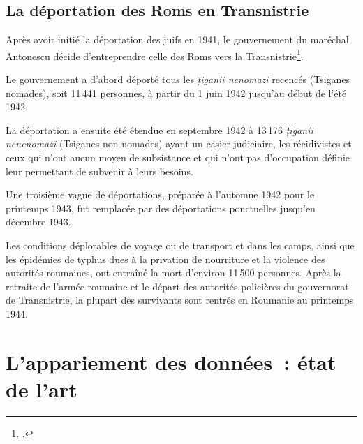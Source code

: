 \documentclass[a4paper,12pt,twoside]{book}
\begin{document}
        \pagebreak
        
        \section*{La déportation des Roms en Transnistrie}
	    
	        Après avoir initié la déportation des juifs en 1941, le gouvernement du maréchal Antonescu décide d'entreprendre celle des Roms vers la Transnistrie\footcites[Quelques titres de référence détaillant la déportation des Roms :][]{achimRomaRomanianHistory2004,achimDeportationRromsTransnistrie2016,internationalcommisionontheholocaustinromaniaFinalReport2005a,aboutGenocidePersecutionRoma2016}.
	        
	        Le gouvernement a d'abord déporté tous les \og{}\textit{țiganii nenomazi}\fg{} recencés (Tsiganes nomades), soit 11\,441 personnes, à partir du 1\ier{} juin 1942 jusqu'au début de l'été 1942. 
                
            La déportation a ensuite été étendue en septembre 1942 à 13\,176 \og{}\textit{țiganii nenenomazi}\fg{} (Tsiganes non nomades) \og{}ayant un casier judiciaire, les récidivistes et ceux qui n'ont aucun moyen de subsistance et qui n'ont pas d'occupation définie leur permettant de subvenir à leurs besoins\fg{}. 
                
            Une troisième vague de déportations, préparée à l'automne 1942 pour le printemps 1943, fut remplacée par des déportations ponctuelles jusqu'en décembre 1943.
            \medskip
                
            Les conditions déplorables de voyage ou de transport et dans les camps, ainsi que les épidémies de typhus dues à la privation de nourriture et la violence des autorités roumaines, ont entraîné la mort d’environ 11\,500 personnes. Après la retraite de l’armée roumaine et le départ des autorités policières du gouvernorat de Transnistrie, la plupart des survivants sont rentrés en Roumanie au printemps 1944.

    	   \newpage

	\chapter[L'appariement des données~: état de l'art]{L'appariement des données~: état de l'art}
	
\end{document}
